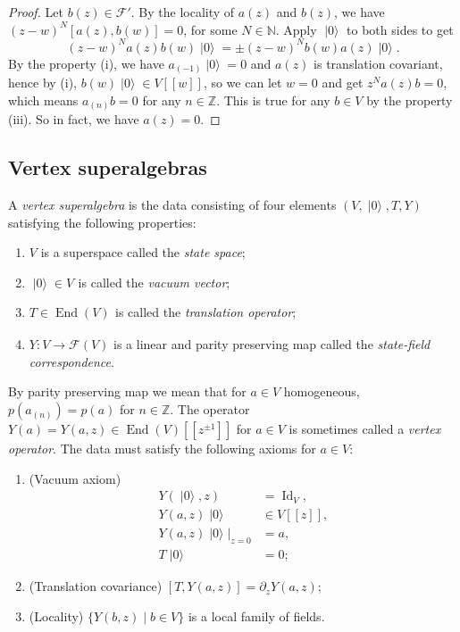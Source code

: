 \documentclass[a4paper, 12pt, reqno]{amsart}
\theoremstyle{remark}
\numberwithin{equation}{subsection}
\DeclareMathOperator{\Id}{Id}
\DeclareMathOperator{\End}{End}
\DeclareMathOperator{\vac}{|0\rangle}
\DeclareMathOperator{\zero}{\overline{0}}
\begin{document}
\begin{proof}
  Let $b(z) \in \mathcal{F}'$.
  By the locality of $a(z)$ and $b(z)$, we have $(z - w)^N[a(z), b(w)] = 0$, for some $N \in \mathbb{N}$.
  Apply $\vac$ to both sides to get
  \begin{equation*}
    (z - w)^Na(z)b(w)\vac = \pm(z - w)^Nb(w)a(z)\vac.
  \end{equation*}
  By the property (i), we have $a_{(-1)}\vac = 0$ and $a(z)$ is translation covariant, hence by (i), $b(w)\vac \in V[[w]]$, so we can let $w = 0$ and get $z^Na(z)b = 0$, which means $a_{(n)}b = 0$ for any $n \in \mathbb{Z}$.
  This is true for any $b \in V$ by the property (iii).
  So in fact, we have $a(z) = 0$.
\end{proof}

\subsection{Vertex superalgebras}
\label{sec:vertex-superalgebras}

A \emph{vertex superalgebra} is the data consisting of four elements $(V, \vac, T, Y)$ satisfying the following properties:
\begin{enumerate}
\item $V$ is a superspace called the \emph{state space};
\item $\vac \in V_{\zero}$ is called the \emph{vacuum vector};
\item $T \in \End(V)_{\zero}$ is called the \emph{translation operator};
\item $Y: V \to \mathcal{F}(V)$ is a linear and parity preserving map called the \emph{state-field correspondence}.
\end{enumerate}
By parity preserving map we mean that for $a \in V$ homogeneous, $p(a_{(n)}) = p(a)$ for $n \in \mathbb{Z}$.
The operator $Y(a) = Y(a, z) \in \End(V)[[z^{\pm 1}]]$ for $a \in V$ is sometimes called a \emph{vertex operator}.
The data must satisfy the following axioms for $a \in V$:
\begin{enumerate}
\item (Vacuum axiom)
  \begin{align*}
    Y(\vac,z) &= \Id_V, \\
    Y(a, z)\vac &\in V[[z]], \\
    Y(a, z)\vac|_{z = 0} &= a, \\
    T\vac &= 0;
  \end{align*}
\item (Translation covariance) $[T, Y(a, z)] = \partial_zY(a, z)$;
\item (Locality) $\{Y(b, z) \mid b \in V\}$ is a local family of fields.
\end{enumerate}
\end{document}
